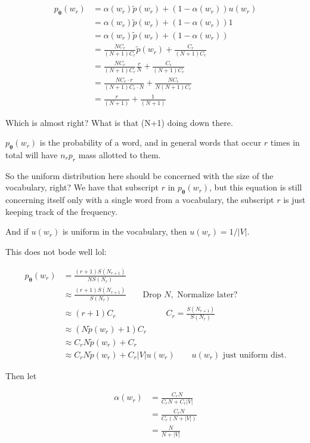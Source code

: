 \documentclass{article}
\newcommand{\vtheta}{\boldsymbol{\theta}}
\newcommand{\model}{p_{\vtheta}}
\begin{document}
		\begin{align}
	    	\model(w_r) &= \alpha(w_r)\tilde{p}(w_r) + (1-\alpha(w_r)) u(w_r)\\
	    	&= \alpha(w_r)\tilde{p}(w_r) + (1-\alpha(w_r)) 1\\
	    	&= \alpha(w_r)\tilde{p}(w_r) + (1-\alpha(w_r))\\
	    	&= \frac{NC_r}{(N+1)C_r}\tilde{p}(w_r) + \frac{C_r}{(N+1)C_r}\\
	    	&= \frac{NC_r}{(N+1)C_r}\frac{r}{N} + \frac{C_r}{(N+1)C_r}\\
	    	&= \frac{NC_r\cdot r}{(N+1)C_r\cdot N} + \frac{NC_r}{N(N+1)C_r}\\
	    	&= \frac{r}{(N+1)} + \frac{1}{(N+1)}	
	    \end{align}
		
		Which is almost right? What is that (N+1) doing down there.
		
		$\model(w_r)$ is the probability of a word, and in general words that occur $r$ times in total will have $n_rp_r$ mass allotted to them. 
		
		So the uniform distribution here should be concerned with the size of the vocabulary, right? We have that subscript $r$ in $\model(w_r)$, but this equation is still concerning itself only with a single word from a vocabulary, the subscript $r$ is just keeping track of the frequency.
		
		And if $u(w_r)$ is uniform in the vocabulary, then $u(w_r) = 1/|V|$.
		
		This does not bode well lol:		
		
		\begin{align}
	    	\model(w_r) &= \frac{(r+1)S(N_{r+1})}{NS(N_r)} \\
	    	&\approx  \frac{(r+1)S(N_{r+1})}{S(N_r)}\qquad\text{Drop } N,\text{ Normalize later?}\\
	    	&\approx (r+1)C_r \qquad\qquad\qquad C_r=\frac{S(N_{r+1})}{S(N_r)}\\
	    	&\approx (N\tilde{p}(w_r)+1)C_r \\
	    	&\approx C_r N\tilde{p}(w_r) + C_r \\
	    	&\approx C_r N\tilde{p}(w_r) + C_r |V| u(w_r)\qquad u(w_r)\text{ just uniform dist.} 
	    \end{align}
	    
	    Then let 
	    
	    \begin{align}
	    	\alpha(w_r) &= \frac{C_r N}{ C_r N + C_r|V|}\\
	    	&= \frac{C_r N}{ C_r (N + |V|)}\\
	    	&= \frac{N}{N + |V|}
	    \end{align}
	    
\end{document}
